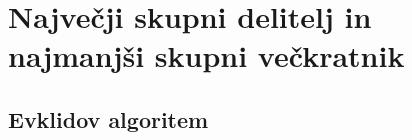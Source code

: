 \documentclass[10pt,a4paper,oneside]{book}
\begin{document}

\section{Največji skupni delitelj in najmanjši skupni večkratnik}
\subsection{Evklidov algoritem}

\end{document}
